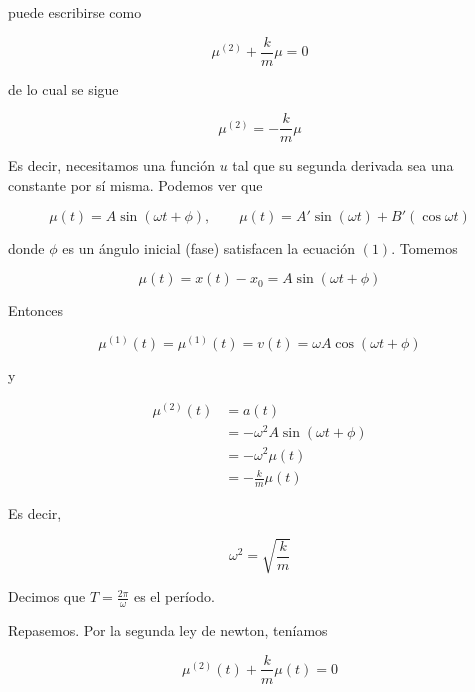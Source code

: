 \documentclass[12pt]{article}
\theoremstyle{definition}
\begin{document}
puede escribirse como 

\begin{equation*}
    \mu^{(2)} + \frac{k}{m}\mu = 0
\end{equation*}

de lo cual se sigue 

\begin{equation}
    \mu^{(2)} = -\frac{k}{m}\mu
\end{equation}

Es decir, necesitamos una función $u$ tal que su segunda derivada sea una
constante por sí misma. Podemos ver que 

\begin{equation*}
    \mu(t) 
    = A \sin\left( \omega  t + \phi \right), \qquad \mu(t) = A' \sin(\omega t) + B'
(\cos \omega  t) \end{equation*}

donde $\phi$ es un ángulo inicial (fase) satisfacen la ecuación $(1)$. Tomemos 

\begin{equation*}
    \mu(t) = x(t) - x_0 = A \sin(\omega t + \phi)
\end{equation*}

Entonces 

\begin{equation*}
    \mu^{(1)}(t) = \mu^{(1)}(t) = v(t) = \omega A \cos(\omega t + \phi)
\end{equation*}

y 

\begin{align*}
    \mu^{(2)}(t) 
    &= a(t) \\
    &= - \omega^2 A \sin(\omega t + \phi) \\ 
    &= -\omega^2 \mu(t) \\ 
    &= -\frac{k}{m}\mu(t)
\end{align*}

Es decir, 

\begin{equation*}
    \omega^2 =\sqrt{\frac{k}{m}}  
\end{equation*}

Decimos que $T= \frac{2\pi}{\omega}$ es el período. 

Repasemos. Por la segunda ley de newton, teníamos 

\begin{equation*}
    \mu^{(2)}(t) + \frac{k}{m} \mu(t) = 0
\end{equation*}
\end{document}
